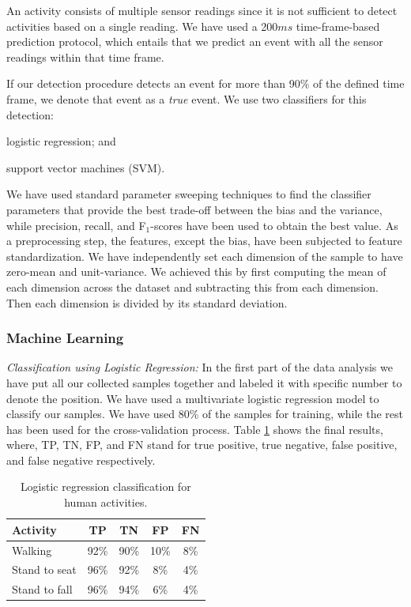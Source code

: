 \documentclass[letterpaper]{article}
\begin{document}
An activity consists of multiple sensor readings since it is not sufficient to detect activities based 
on a single reading. We have used a 200$ms$ time-frame-based prediction protocol, which entails that we
predict an event with all the sensor readings within that time frame. 

If our detection procedure detects an event for more than 90\% of the defined time frame, we denote that 
event as a \textit{true} event. We use two classifiers for this detection: \begin{inparaenum}[1)] 
\item logistic regression; and \item support vector machines (SVM)\cite{Bishop:2006:PRM:1162264}. 
\end{inparaenum} 
We have used standard parameter sweeping techniques to find the classifier parameters that provide 
the best trade-off between the bias and the variance, while precision, recall, and F$_1$-scores have 
been used to obtain the best value. As a preprocessing step, the features, except the bias, have 
been subjected to feature standardization. We have independently set each dimension of the sample 
to have zero-mean and unit-variance. We achieved this by first computing the mean of each dimension 
across the dataset and subtracting this from each dimension. Then each dimension is divided by its 
standard deviation.

\subsubsection{Machine Learning\\}
\emph{Classification using Logistic Regression:}
In the first part of the data analysis we have put all our collected samples together and labeled it
with specific number to denote the position. We have used a multivariate logistic regression model to
classify our samples. We have used 80\% of the samples for training, while the rest has been used
for the cross-validation process. Table \ref{tab:human-logistic-class} shows the final results, where, TP, TN, 
FP, and FN stand for true positive, true negative, false positive, and false negative respectively. 

\begin{table}[!ht]
\caption{Logistic regression classification for human activities.}
	\label{tab:human-logistic-class}
	\centering
		\begin{tabular} {|l |c |c |c|c|}
			\hline
			{\bf Activity} & {\bf  TP}  &	{\bf TN}  &	{\bf FP} &	{\bf FN} \\ 
			\hline
			Walking	& 92\%	& 90\%	& 10\%	& 8\% \\ \hline
			Stand to seat	& 96\%	& 92\%	& 8\% & 	4\%	 \\ \hline 
			Stand to fall	& 96\%	& 94\%	& 6\%	& 4\%	 \\ \hline
		\end{tabular}
\end{table}
\end{document}
